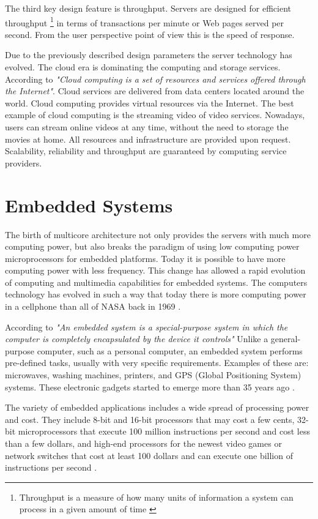 The third key design feature is throughput. Servers are designed for efficient
throughput \footnote{Throughput is a measure of how many units of information a
system can process in a given amount of time \cite{Dongxu}} in terms of
transactions per minute or Web pages served per second. From the user
perspective point of view this is the speed of response.

Due to the previously described design parameters the server technology has
evolved. The cloud era is dominating the computing and storage services.
According to \cite {Farhan} \textit{"Cloud computing is a set of resources and
services offered through the Internet"}. Cloud services are delivered from data
centers located around the world.  Cloud computing provides virtual resources
via the Internet. The best example of cloud computing is the streaming video of
video services. Nowadays, users can stream online videos  at any time, without the
need to storage the movies at home. All resources and infrastructure are
provided upon request. Scalability, reliability and throughput 
are guaranteed by computing service providers. 

\section{Embedded Systems}
\noindent

The birth of multicore architecture not only provides the servers with much
more computing power, but also breaks the paradigm of using low computing power
microprocessors for embedded platforms. Today it is possible to have more
computing power with less frequency. This change has allowed a rapid evolution
of computing and multimedia capabilities for embedded systems. The computers
technology has evolved in such a way that today there is more computing power
in a cellphone than all of NASA back in 1969 \cite{Michio}.

According to \cite{Hallinan} \textit{"An embedded system is a special-purpose
system in which the computer is completely encapsulated by the device it
controls"} Unlike a general-purpose computer, such as a personal computer, an
embedded system performs pre-defined tasks, usually with very specific
requirements. Examples of these are: microwaves, washing machines, printers, and
GPS (Global Positioning System) systems. These electronic gadgets started to
emerge more than 35 years ago \cite{Nur}.

The variety of embedded applications includes a wide spread of processing 
power and cost. They include 8-bit and 16-bit processors that may
cost a few cents, 32-bit microprocessors that execute 100 million instructions
per second and cost less than a few dollars, and high-end processors for the
newest video games or network switches that cost at least 100 dollars and can
execute one billion of instructions per second \cite{Hennessy}.

